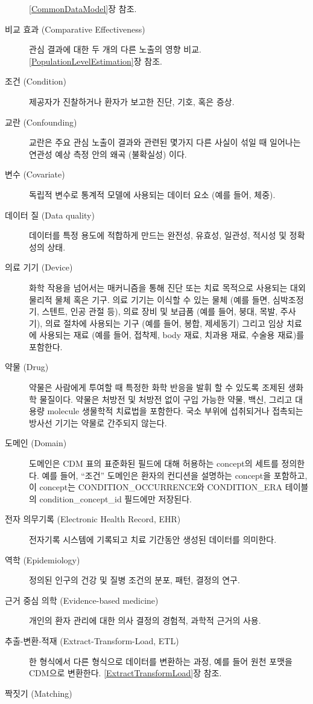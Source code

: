 \documentclass[11pt]{book}
\theoremstyle{definition}
\theoremstyle{definition}
\theoremstyle{definition}
\theoremstyle{remark}
\begin{document}
\begin{description}
\ref{CommonDataModel}장 참조.
\item[비교 효과 (Comparative Effectiveness)]
관심 결과에 대한 두 개의 다른 노출의 영향 비교.
\ref{PopulationLevelEstimation}장 참조.
\item[조건 (Condition)]
제공자가 진찰하거나 환자가 보고한 진단, 기호, 혹은 증상.
\item[교란 (Confounding)]
교란은 주요 관심 노출이 결과와 관련된 몇가지 다른 사실이 섞일 때
일어나는 연관성 예상 측정 안의 왜곡 (불확실성) 이다.
\item[변수 (Covariate)]
독립적 변수로 통계적 모델에 사용되는 데이터 요소 (예를 들어, 체중).
\item[데이터 질 (Data quality)]
데이터를 특정 용도에 적합하게 만드는 완전성, 유효성, 일관성, 적시성 및
정확성의 상태.
\item[의료 기기 (Device)]
화학 작용을 넘어서는 매커니즘을 통해 진단 또는 치료 목적으로 사용되는
대외 물리적 물체 혹은 기구. 의료 기기는 이식할 수 있는 물체 (예를 들면,
심박조정기, 스텐트, 인공 관절 등), 의료 장비 및 보급품 (예를 들어, 붕대,
목발, 주사기), 의료 절차에 사용되는 기구 (예를 들어, 봉합, 제세동기)
그리고 임상 치료에 사용되는 재료 (예를 들어, 접착제, body 재료, 치과용
재료, 수술용 재료)를 포함한다.
\item[약물 (Drug)]
약물은 사람에게 투여할 때 특정한 화학 반응을 발휘 할 수 있도록 조제된
생화학 물질이다. 약물은 처방전 및 처방전 없이 구입 가능한 약물, 백신,
그리고 대용량 molecule 생물학적 치료법을 포함한다. 국소 부위에
섭취되거나 접촉되는 방사선 기기는 약물로 간주되지 않는다.
\item[도메인 (Domain)]
도메인은 CDM 표의 표준화된 필드에 대해 허용하는 concept의 세트를
정의한다. 예를 들어, ``조건'' 도메인은 환자의 컨디션을 설명하는
concept을 포함하고, 이 concept는 CONDITION\_OCCURRENCE와 CONDITION\_ERA
테이블의 condition\_concept\_id 필드에만 저장된다.
\item[전자 의무기록 (Electronic Health Record, EHR)]
전자기록 시스템에 기록되고 치료 기간동안 생성된 데이터를 의미한다.
\item[역학 (Epidemiology)]
정의된 인구의 건강 및 질병 조건의 분포, 패턴, 결정의 연구.
\item[근거 중심 의학 (Evidence-based medicine)]
개인의 환자 관리에 대한 의사 결정의 경험적, 과학적 근거의 사용.
\item[추출-변환-적재 (Extract-Transform-Load, ETL)]
한 형식에서 다른 형식으로 데이터를 변환하는 과정, 예를 들어 원천 포맷을
CDM으로 변환한다. \ref{ExtractTransformLoad}장 참조.
\item[짝짓기 (Matching)]

\end{description}
\end{document}
